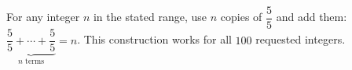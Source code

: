 For any integer $n$ in the stated range, use $n$ copies of $\dfrac{5}{5}$ and add them: $\underbrace{\dfrac{5}{5}+\cdots+\dfrac{5}{5}}_{n\text{ terms}}=n$. This construction works for all $100$ requested integers.
